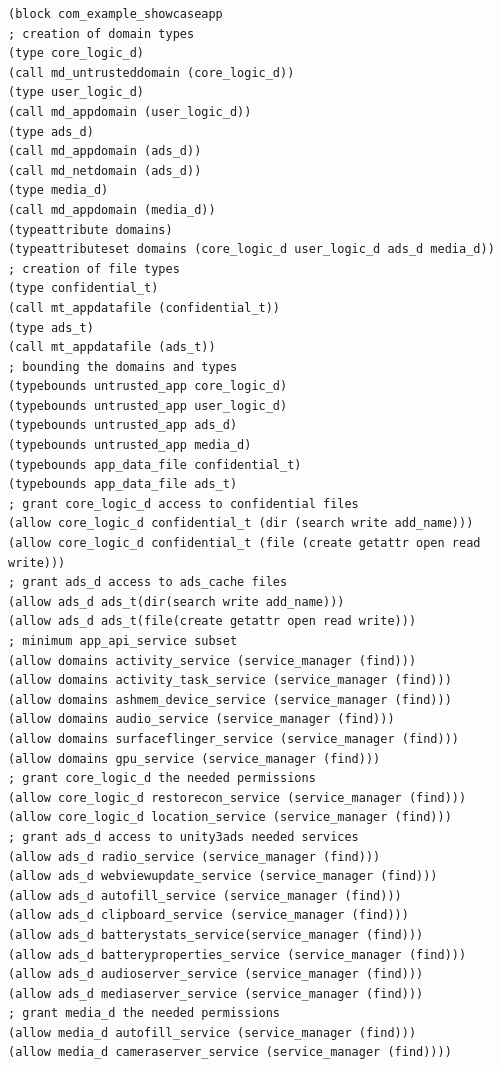 \begin{lstlisting}[language=policyfile, caption=Showcase app \sepolicy,
captionpos=b, numbersep=2pt, resetmargins=false, label=seapp_sepolctxp]
(block com_example_showcaseapp
; creation of domain types
(type core_logic_d)
(call md_untrusteddomain (core_logic_d))
(type user_logic_d)
(call md_appdomain (user_logic_d))
(type ads_d)
(call md_appdomain (ads_d))
(call md_netdomain (ads_d))
(type media_d)
(call md_appdomain (media_d))
(typeattribute domains)
(typeattributeset domains (core_logic_d user_logic_d ads_d media_d))
; creation of file types
(type confidential_t)
(call mt_appdatafile (confidential_t))
(type ads_t)
(call mt_appdatafile (ads_t))
; bounding the domains and types
(typebounds untrusted_app core_logic_d)
(typebounds untrusted_app user_logic_d)
(typebounds untrusted_app ads_d)
(typebounds untrusted_app media_d)	
(typebounds app_data_file confidential_t)
(typebounds app_data_file ads_t)
; grant core_logic_d access to confidential files
(allow core_logic_d confidential_t (dir (search write add_name)))
(allow core_logic_d confidential_t (file (create getattr open read write)))
; grant ads_d access to ads_cache files
(allow ads_d ads_t(dir(search write add_name)))
(allow ads_d ads_t(file(create getattr open read write)))
; minimum app_api_service subset
(allow domains activity_service (service_manager (find)))
(allow domains activity_task_service (service_manager (find)))
(allow domains ashmem_device_service (service_manager (find)))
(allow domains audio_service (service_manager (find)))
(allow domains surfaceflinger_service (service_manager (find)))
(allow domains gpu_service (service_manager (find)))
; grant core_logic_d the needed permissions
(allow core_logic_d restorecon_service (service_manager (find)))
(allow core_logic_d location_service (service_manager (find)))
; grant ads_d access to unity3ads needed services
(allow ads_d radio_service (service_manager (find)))
(allow ads_d webviewupdate_service (service_manager (find)))
(allow ads_d autofill_service (service_manager (find)))
(allow ads_d clipboard_service (service_manager (find)))
(allow ads_d batterystats_service(service_manager (find)))
(allow ads_d batteryproperties_service (service_manager (find)))
(allow ads_d audioserver_service (service_manager (find)))
(allow ads_d mediaserver_service (service_manager (find)))
; grant media_d the needed permissions
(allow media_d autofill_service (service_manager (find)))
(allow media_d cameraserver_service (service_manager (find))))
\end{lstlisting}


